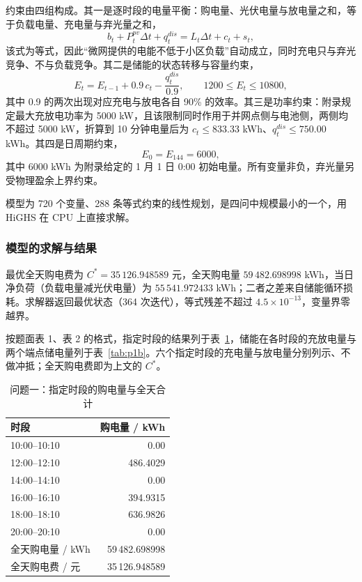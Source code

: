 约束由四组构成。其一是逐时段的电量平衡：购电量、光伏电量与放电量之和，等于负载电量、充电量与弃光量之和，
\begin{equation*}
b_t+P^{pv}_t\Delta t+q^{dis}_t=L_t\Delta t+c_t+s_t ,
\end{equation*}
该式为等式，因此“微网提供的电能不低于小区负载”自动成立，同时充电只与弃光竞争、不与负载竞争。其二是储能的状态转移与容量约束，
\begin{equation*}
E_t=E_{t-1}+0.9\,c_t-\frac{q^{dis}_t}{0.9},\qquad 1200\le E_t\le 10800 ,
\end{equation*}
其中 0.9 的两次出现对应充电与放电各自 90\% 的效率。其三是功率约束：附录规定最大充放电功率为 5000 kW，且该限制同时作用于并网点侧与电池侧，两侧均不超过 5000 kW，折算到 10 分钟电量后为 $c_t\le 833.33$ kWh、$q^{dis}_t\le 750.00$ kWh。其四是日周期约束，
\begin{equation}
E_0=E_{144}=6000 ,
\end{equation}
其中 6000 kWh 为附录给定的 1 月 1 日 0:00 初始电量。所有变量非负，弃光量另受物理盈余上界约束。

模型为 720 个变量、288 条等式约束的线性规划，是四问中规模最小的一个，用 HiGHS 在 CPU 上直接求解。

\subsubsection{模型的求解与结果}

最优全天购电费为 $C^{*}=35\,126.948589$ 元，全天购电量 $59\,482.698998$ kWh，当日净负荷（负载电量减光伏电量）为 $55\,541.972433$ kWh；二者之差来自储能循环损耗。求解器返回最优状态（364 次迭代），等式残差不超过 $4.5\times10^{-13}$，变量界零越界。

按题面表 1、表 2 的格式，指定时段的结果列于表~\ref{tab:p1a}，储能在各时段的充放电量与两个端点储电量列于表~\ref{tab:p1b}。六个指定时段的充电量与放电量分别列示、不做冲抵；全天购电费即为上文的 $C^{*}$。

\begin{table}[htbp]
\centering
\small
\caption{问题一：指定时段的购电量与全天合计}
\label{tab:p1a}
\begin{tabular}{lr}
\toprule
时段 & 购电量 / kWh \\
\midrule
10:00--10:10 & 0.00 \\
12:00--12:10 & 486.4029 \\
14:00--14:10 & 0.00 \\
16:00--16:10 & 394.9315 \\
18:00--18:10 & 636.9826 \\
20:00--20:10 & 0.00 \\
\midrule
全天购电量 / kWh & 59\,482.698998 \\
全天购电费 / 元 & 35\,126.948589 \\
\bottomrule
\end{tabular}
\end{table}

